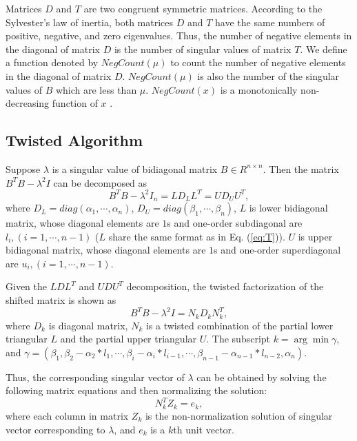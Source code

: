 Matrices $D$ and $T$ are two congruent symmetric matrices.
According to the Sylvester's law of inertia, both matrices $D$ and $T$ have the same numbers of positive, negative, and zero eigenvalues.
Thus, the number of negative elements in the diagonal of matrix $D$ is the number of singular values of matrix $T$.
We define a function denoted by $NegCount(\mu)$ to count the number of negative elements in the diagonal of matrix $D$. %
$NegCount(\mu)$ is also the number of the singular values of $B$ which are less than $\mu$.
$NegCount(x)$ is a monotonically non-decreasing function of $x$ \cite{95ETNAbisecion}.

\subsection{Twisted Algorithm}
Suppose $\lambda$ is a singular value of bidiagonal matrix $B \in R^{n \times n}$.
Then the matrix $B^T B - \lambda^2 I$ can be decomposed as
\begin{equation}
B^T B - \lambda^2 I_n = L D_L L^T = U D_U U^T ,
\end{equation}
where $D_L=diag(\alpha_1, \cdots, \alpha_n)$, $D_U = diag(\beta_1, \cdots, \beta_n)$, 
$L$ is lower bidiagonal matrix, whose diagonal elements are $1$s and one-order subdiagonal are $l_{i}, (i=1,\cdots,n-1)$ ($L$ share the same format as in Eq. (\ref{eq:T})).
$U$ is upper bidiagonal matrix, whose diagonal elements are $1$s and one-order superdiagonal are $u_{i}, (i=1,\cdots,n-1)$. 

Given the $LDL^T$ and $UDU^T$ decomposition, the twisted factorization of the shifted matrix is shown as
\begin{equation}
B^T B - \lambda^2 I = N_k D_k N_k^T ,
\label{eq:twisted}
\end{equation}
where $D_k$ is diagonal matrix, $N_k$ is a twisted combination of the partial lower triangular $L$ and the partial upper triangular $U$.
The subscript $k = \arg \min \gamma$, and $\gamma = (\beta_1, \beta_2 - \alpha_2 * l_1, \cdots, \beta_i - \alpha_i * l_{i-1}, \cdots, \beta_{n-1} - \alpha_{n-1} * l_{n-2}, \alpha_n)$.

Thus, the corresponding singular vector of $\lambda$ can be obtained by solving the following matrix equations and then normalizing the solution:
\begin{equation}
N_k^T Z_k = e_k,
\label{eq:unnorm}
\end{equation}
 where each column in matrix $Z_k$ is the non-normalization solution of singular vector corresponding to $\lambda$, and $e_k$ is a $k$th unit vector.

